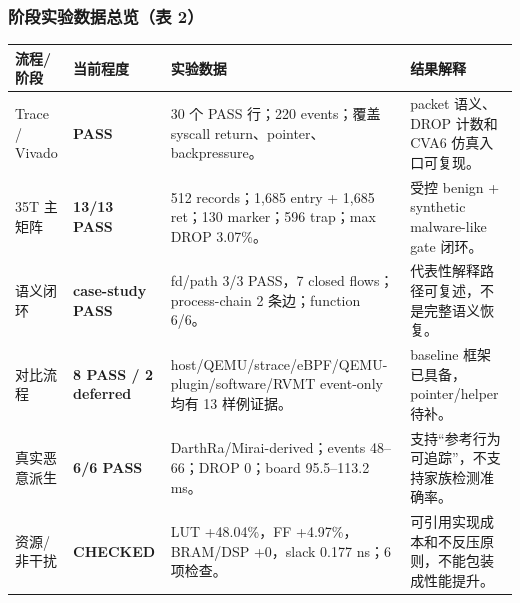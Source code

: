 \documentclass[aspectratio=169,10pt]{beamer}
\newcommand{\tagok}[1]{\textcolor{rvgreen}{\textbf{#1}}}
\begin{document}
\begin{frame}
  \frametitle{阶段实验数据总览（表 2）}
  \vskip0.05cm
  \begin{center}\tiny
  \renewcommand{\arraystretch}{1.06}
  \begin{tabularx}{0.98\linewidth}{@{}L{2.15cm}L{2.15cm}L{3.65cm}Y@{}}
    \toprule
    \textbf{流程/阶段} & \textbf{当前程度} & \textbf{实验数据} & \textbf{结果解释} \\
    \midrule
    Trace / Vivado & \tagok{PASS} & 30 个 PASS 行；220 events；覆盖 syscall return、pointer、backpressure。 & packet 语义、DROP 计数和 CVA6 仿真入口可复现。 \\
    35T 主矩阵 & \tagok{13/13 PASS} & 512 records；1,685 entry + 1,685 ret；130 marker；596 trap；max DROP 3.07\%。 & 受控 benign + synthetic malware-like gate 闭环。 \\
    语义闭环 & \tagok{case-study PASS} & fd/path 3/3 PASS，7 closed flows；process-chain 2 条边；function 6/6。 & 代表性解释路径可复述，不是完整语义恢复。 \\
    对比流程 & \tagok{8 PASS / 2 deferred} & host/QEMU/strace/eBPF/QEMU-plugin/software/RVMT event-only 均有 13 样例证据。 & baseline 框架已具备，pointer/helper 待补。 \\
    真实恶意派生 & \tagok{6/6 PASS} & DarthRa/Mirai-derived；events 48--66；DROP 0；board 95.5--113.2 ms。 & 支持“参考行为可追踪”，不支持家族检测准确率。 \\
    资源/非干扰 & \tagok{CHECKED} & LUT +48.04\%，FF +4.97\%，BRAM/DSP +0，slack 0.177 ns；6 项检查。 & 可引用实现成本和不反压原则，不能包装成性能提升。 \\
    \bottomrule
  \end{tabularx}
  \end{center}
\end{frame}
\end{document}
